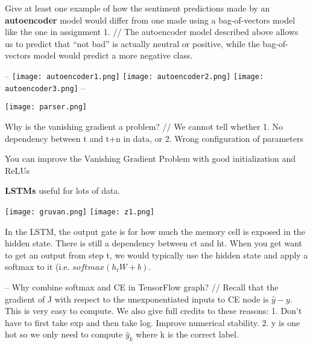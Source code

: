 Give at least one example of how the sentiment predictions made by an \textbf{autoencoder} model would differ from one made using a bag-of-vectors model like the one in assignment 1. //
The autoencoder model described above allows us to predict that “not bad” is actually neutral or positive, while the bag-of-vectors model would predict a more negative class.

--
\texttt{[image: autoencoder1.png]}
\texttt{[image: autoencoder2.png]}
\texttt{[image: autoencoder3.png]}
--

\texttt{[image: parser.png]}

Why	is	the	vanishing	gradient	a	problem? //
We	cannot	tell	whether
1. No	dependency	between	t and	t+n in	data,	or
2. Wrong	configuration	of	parameters

You	can	improve	the	Vanishing	Gradient	Problem	with	good
initialization	and	ReLUs

\textbf{LSTMs} useful for lots of data.

\texttt{[image: gruvan.png]}
\texttt{[image: z1.png]}

In the LSTM, the output gate is for how much the memory cell is exposed in the hidden state. There is still a dependency between ct and ht. When you get want to get an output from step t, we would typically use the hidden state and apply a softmax to it (i.e. $softmax(h_tW+b)$.

-- Why combine softmax and CE in TensorFlow graph? //
Recall that the gradient of J with respect to the unexponentiated inputs to CE node is $\hat y − y$.
This is very easy to compute.
We also give full credits to these reasons:
1. Don’t have to first take exp and then take log. Improve numerical stability.
2. y is one hot so we only need to compute $\hat y_k$ where k is the correct label.
